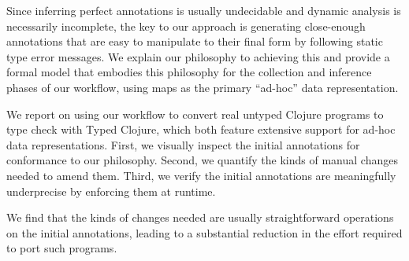 Since inferring perfect annotations is usually undecidable
and dynamic analysis is necessarily incomplete,
the key to our approach is generating close-enough annotations
that are easy to manipulate to their final form by following static type error
messages.
We explain our philosophy to achieving this
and provide a formal model that embodies this philosophy
for the collection and inference phases of our workflow,
using maps as the primary ``ad-hoc'' data representation.

We report on using our workflow to convert real untyped Clojure programs to type check with Typed Clojure,
which both feature extensive support for ad-hoc data representations.
First, we visually inspect the initial annotations for conformance to our philosophy.
Second, we quantify the kinds of manual changes needed to amend them.
Third, we verify the initial annotations are meaningfully underprecise by enforcing them at runtime.

We find that the kinds of changes needed are
usually straightforward operations on the initial annotations,
leading to a substantial reduction in the effort required to port such programs.





